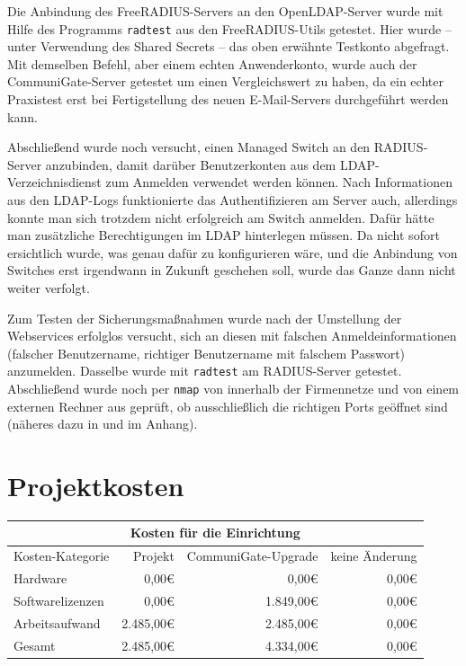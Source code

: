 \documentclass[11pt,a4paper,titlepage=firstiscover,headsepline,bibtotoc]{scrartcl} %
\newcommand{\hilight}[1]{\colorbox{yellow}{#1}} %
\newcommand{\mcc}[2]{\multicolumn{#1}{|c|}{#2}} %
\begin{document}
Die Anbindung des FreeRADIUS-Servers an den OpenLDAP-Server wurde mit Hilfe des Programms \texttt{radtest} aus den FreeRADIUS-Utils getestet. Hier wurde -- unter Verwendung des Shared Secrets -- das oben erwähnte Testkonto abgefragt. Mit demselben Befehl, aber einem echten Anwenderkonto, wurde auch der CommuniGate-Server getestet um einen Vergleichswert zu haben, da ein echter Praxistest erst bei Fertigstellung des neuen E-Mail-Servers durchgeführt werden kann.

Abschließend wurde noch versucht, einen Managed Switch an den RADIUS-Server anzubinden, damit darüber Benutzerkonten aus dem LDAP-Verzeichnisdienst zum Anmelden verwendet werden können. Nach Informationen aus den LDAP-Logs funktionierte das Authentifizieren am Server auch, allerdings konnte man sich trotzdem nicht erfolgreich am Switch anmelden. Dafür hätte man zusätzliche Berechtigungen im LDAP hinterlegen müssen. Da nicht sofort ersichtlich wurde, was genau dafür zu konfigurieren wäre, und die Anbindung von Switches erst irgendwann in Zukunft geschehen soll, wurde das Ganze dann nicht weiter verfolgt.

\medskip \noindent
Zum Testen der Sicherungsmaßnahmen wurde nach der Umstellung der Webservices erfolglos versucht, sich an diesen mit falschen Anmeldeinformationen (falscher Benutzername, richtiger Benutzername mit falschem Passwort) anzumelden. Dasselbe wurde mit \texttt{radtest} am RADIUS-Server getestet.
Abschließend wurde noch per \texttt{nmap} von innerhalb der Firmennetze und von einem externen Rechner aus geprüft, ob ausschließlich die richtigen Ports geöffnet sind (näheres dazu in  und  im Anhang).


\section{Projektkosten}\label{sec:Kosten}
\begin{tabularx}{\textwidth}{|X|r|r|r|}
\hline
\mcc{4}{Kosten für die Einrichtung}\\
\hline
Kosten-Kategorie	&	Projekt &	CommuniGate-Upgrade &	keine Änderung\\
\hline
Hardware &	0,00\euro{} &	0,00\euro{} &	0,00\euro{}\\
\hline
Softwarelizenzen &	0,00\euro{} &	1.849,00\euro{} &	0,00\euro{}\\
\hline
Arbeitsaufwand &	2.485,00\euro{} &	2.485,00\euro{} &	0,00\euro{}\\
\hhline{|=|=|=|=|}
Gesamt &	2.485,00\euro{} &	4.334,00\euro{} &	0,00\euro{}\\
\hline
\end{tabularx}
\end{document}
